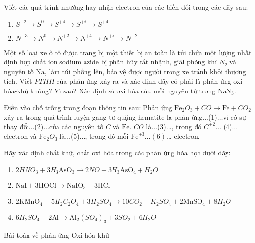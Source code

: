 \begin{bt}
	Viết các quá trình nhường hay nhận electron của các biến đổi trong các dãy sau:
	\begin{enumerate}
		\item $S^{-2} \to S^0\to S^{+4} \to S^{+6} \to S^{+4}$
		\item $N^{-3} \to N^0\to N^{+2} \to N^{+4} \to N^{+5} \to N^{+2}$
	\end{enumerate}
	\loigiai{}
\end{bt}
\begin{bt}
	Một số loại xe ô tô được trang bị một thiết bị an toàn là túi chứa một lượng nhất định hợp chất ion sodium azide bị phân hủy rất nhậnh, giải phóng khí $N_2$ và nguyên tố $\mathrm{Na}$, làm túi phồng lên, bảo vệ được người trong xe tránh khỏi thương tích. Viết $PTHH$ của phản ứng xảy ra và xác định đây có phải là phản ứng oxi hóa-khử không? Vì sao? Xác định số oxi hóa của mỗi nguyên tử trong $\mathrm{NaN}_3$.
	\loigiai{}
\end{bt}
\begin{bt}
	Điền vào chỗ trống trong đoạn thông tin sau:
	Phản ứng $\mathrm{Fe}_2O_3+CO \to \mathrm{Fe}+CO_2$ xảy ra trong quá trình luyện gang từ quặng hematite là phản ứng...(1)$\ldots$vì có sự thay đổi$\ldots$(2)$\ldots$của các nguyên tố $C$ và $\mathrm{Fe}$. $CO$ là$\ldots$(3)$\ldots$, trong đó $C^{+2} \ldots$ (4)$\ldots$electron và $\mathrm{Fe}_2O_3$ là$\ldots$(5)$\ldots$, trong đó mỗi $\mathrm{Fe}^{+3} \ldots(6) \ldots$ electron.
	\loigiai{}
\end{bt}
\begin{bt}
	Hãy xác định chất khử, chất oxi hóa trong các phản ứng hóa học dưới đây:
	\begin{enumerate}
		\item $2HNO_3+3H_3\mathrm{AsO}_3\to 2NO+3H_3\mathrm{AsO}_4+H_2O$
		\item $\mathrm{NaI}+3\mathrm{HOCl} \to \mathrm{NaIO}_3+3\mathrm{HCl}$
		\item $2\mathrm{KMnO}_4+5H_2C_2O_4+3H_2SO_4\to 10CO_2+K_2SO_4+2\mathrm{MnSO}_4+8H_2O$
		\item $6H_2SO_4+2\mathrm{Al} \to \mathrm{Al}_2\left(SO_4\right)_3+3SO_2+6H_2O$
	\end{enumerate}
	\loigiai{}
\end{bt}


\begin{dangNTD}{Bài toán về phản ứng Oxi hóa khử}
\end{dangNTD}
\begin{vdm}
\end{vdm}
\begin{vd}
	
	\loigiai{}
\end{vd}

